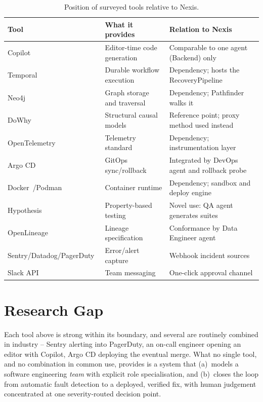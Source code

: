 \begin{table}[htbp]
\caption{Position of surveyed tools relative to Nexis.}
\label{tab:lit-tools}
\centering
\small
\begin{tabular}{@{}lll@{}}
\toprule
\textbf{Tool} & \textbf{What it provides} & \textbf{Relation to Nexis} \\
\midrule
Copilot~\cite{copilot} & Editor-time code generation & Comparable to one agent (Backend) only \\
Temporal~\cite{temporal} & Durable workflow execution & Dependency; hosts the RecoveryPipeline \\
Neo4j~\cite{neo4j} & Graph storage and traversal & Dependency; Pathfinder walks it \\
DoWhy~\cite{dowhy} & Structural causal models & Reference point; proxy method used instead \\
OpenTelemetry~\cite{otel} & Telemetry standard & Dependency; instrumentation layer \\
Argo CD~\cite{argocd} & GitOps sync/rollback & Integrated by DevOps agent and rollback probe \\
Docker~\cite{docker}/Podman~\cite{podman} & Container runtime & Dependency; sandbox and deploy engine \\
Hypothesis~\cite{hypothesis} & Property-based testing & Novel use: QA agent generates suites \\
OpenLineage~\cite{openlineage} & Lineage specification & Conformance by Data Engineer agent \\
Sentry/Datadog/PagerDuty~\cite{sentry,datadog,pagerduty} & Error/alert capture & Webhook incident sources \\
Slack API~\cite{slackapi} & Team messaging & One-click approval channel \\
\bottomrule
\end{tabular}
\end{table}

\section{Research Gap}
\label{sec:lit-gap}

Each tool above is strong within its boundary, and several are routinely
combined in industry -- Sentry alerting into PagerDuty, an on-call engineer
opening an editor with Copilot, Argo CD deploying the eventual merge. What no
single tool, and no combination in common use, provides is a system that
(a)~models a software engineering \emph{team} with explicit role
specialisation, and (b)~closes the loop from automatic fault detection to a
deployed, verified fix, with human judgement concentrated at one
severity-routed decision point.

